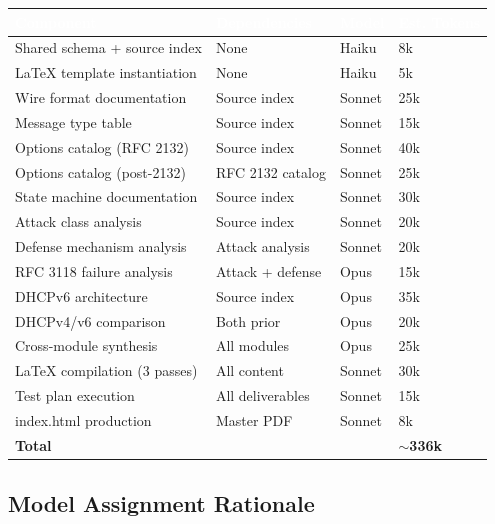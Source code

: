 \documentclass[11pt,letterpaper]{article}
\newcommand{\tableheader}[1]{\textbf{\sffamily\textcolor{white}{#1}}}
\begin{document}
\begin{center}
\begin{tabularx}{\textwidth}{L{2.8cm}L{2.5cm}C{1.8cm}C{2cm}}
\toprule
{}
\tableheader{Component} & \tableheader{Dependencies} & \tableheader{Model} & \tableheader{Est. Tokens} \\
\midrule
Shared schema + source index & None & Haiku & 8k \\
LaTeX template instantiation & None & Haiku & 5k \\
Wire format documentation & Source index & Sonnet & 25k \\
Message type table & Source index & Sonnet & 15k \\
Options catalog (RFC 2132) & Source index & Sonnet & 40k \\
Options catalog (post-2132) & RFC 2132 catalog & Sonnet & 25k \\
State machine documentation & Source index & Sonnet & 30k \\
Attack class analysis & Source index & Sonnet & 20k \\
Defense mechanism analysis & Attack analysis & Sonnet & 20k \\
RFC 3118 failure analysis & Attack + defense & Opus & 15k \\
DHCPv6 architecture & Source index & Opus & 35k \\
DHCPv4/v6 comparison & Both prior & Opus & 20k \\
Cross-module synthesis & All modules & Opus & 25k \\
LaTeX compilation (3 passes) & All content & Sonnet & 30k \\
Test plan execution & All deliverables & Sonnet & 15k \\
index.html production & Master PDF & Sonnet & 8k \\
\midrule
{}
\textbf{Total} & & & \textbf{$\sim$336k} \\
\bottomrule
\end{tabularx}
\end{center}

\subsection{Model Assignment Rationale}
\end{document}
